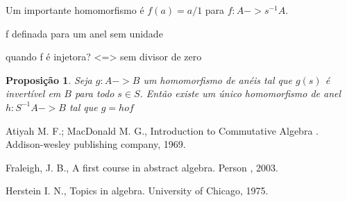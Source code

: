 \documentclass[10pt,a4paper]{article}
\newtheorem{proposition}[theorem]{Proposição}
\begin{document}
Um importante homomorfismo é $f(a)=a/1$ para $f:A->s^{-1}A$.

f definada para um anel sem unidade

quando f é injetora? <=> sem divisor de zero

\begin{proposition} Seja $g:A -> B$ um homomorfismo de anéis tal que $g(s)$ é invertível em $B$ para todo $s \in S$. Então existe um único homomorfismo de anel $h:S^{-1}A ->B$ tal que $g = hof$
\end{proposition}




\newpage

\begin{thebibliography}{20}
	
	  Atiyah M. F.; MacDonald M. G., Introduction to Commutative Algebra . Addison-wesley publishing company, 1969.
	
	  Fraleigh, J. B., A first course in abstract algebra. Person , 2003.
	
	 Herstein I. N., Topics in algebra. University of Chicago, 1975.	
	
\end{thebibliography}
\end{document}

